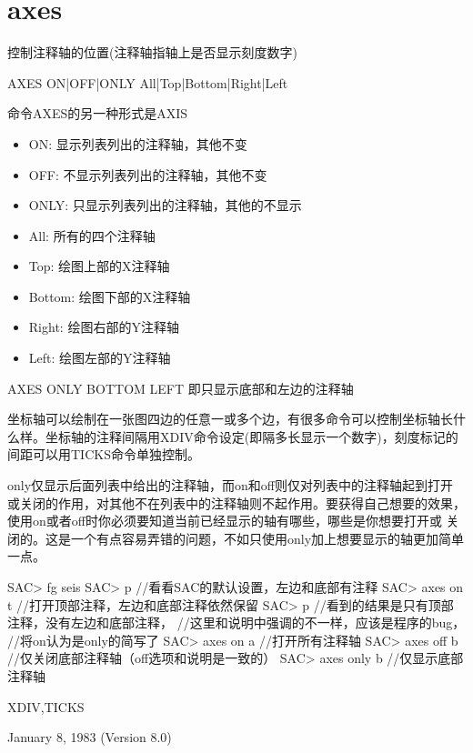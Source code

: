 \section{axes}
\label{cmd:axes}

控制注释轴的位置(注释轴指轴上是否显示刻度数字)

AXES ON|OFF|ONLY All|Top|Bottom|Right|Left

命令AXES的另一种形式是AXIS

\begin{itemize}
\item ON: 显示列表列出的注释轴，其他不变
\item OFF: 不显示列表列出的注释轴，其他不变
\item ONLY: 只显示列表列出的注释轴，其他的不显示
\item All: 所有的四个注释轴
\item Top: 绘图上部的X注释轴
\item Bottom: 绘图下部的X注释轴
\item Right: 绘图右部的Y注释轴
\item Left: 绘图左部的Y注释轴
\end{itemize}

AXES ONLY BOTTOM LEFT	即只显示底部和左边的注释轴

坐标轴可以绘制在一张图四边的任意一或多个边，有很多命令可以控制坐标轴长什么样。坐标轴的注释间隔用XDIV命令设定(即隔多长显示一个数字)，刻度标记的间距可以用TICKS命令单独控制。

only仅显示后面列表中给出的注释轴，而on和off则仅对列表中的注释轴起到打开
或关闭的作用，对其他不在列表中的注释轴则不起作用。要获得自己想要的效果，
使用on或者off时你必须要知道当前已经显示的轴有哪些，哪些是你想要打开或
关闭的。这是一个有点容易弄错的问题，不如只使用only加上想要显示的轴更加简单一点。

\begin{SACCode}
SAC> fg seis
SAC> p           //看看SAC的默认设置，左边和底部有注释
SAC> axes on t   //打开顶部注释，左边和底部注释依然保留
SAC> p           //看到的结果是只有顶部注释，没有左边和底部注释，
                 //这里和说明中强调的不一样，应该是程序的bug，
                 //将on认为是only的简写了
SAC> axes on a   //打开所有注释轴
SAC> axes off b  //仅关闭底部注释轴（off选项和说明是一致的）
SAC> axes only b //仅显示底部注释轴
\end{SACCode}

XDIV,TICKS

January 8, 1983 (Version 8.0)

